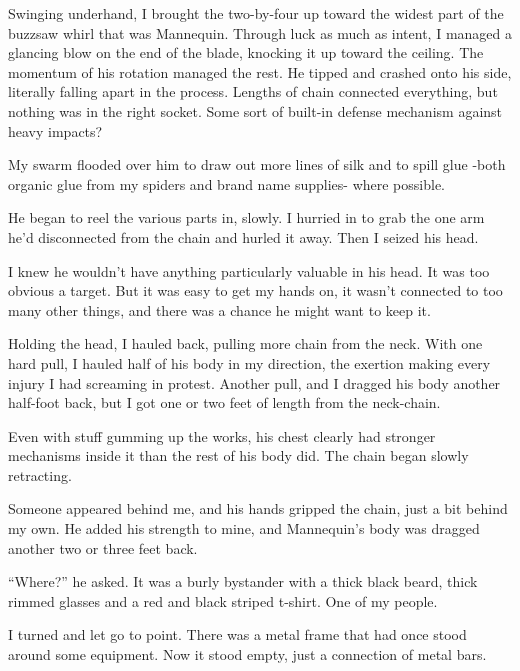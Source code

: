 Swinging underhand, I brought the two-by-four up toward the widest part of the buzzsaw whirl that was Mannequin.  Through luck as much as intent, I managed a glancing blow on the end of the blade, knocking it up toward the ceiling.  The momentum of his rotation managed the rest.  He tipped and crashed onto his side, literally falling apart in the process.  Lengths of chain connected everything, but nothing was in the right socket.  Some sort of built-in defense mechanism against heavy impacts?



My swarm flooded over him to draw out more lines of silk and to spill glue -both organic glue from my spiders and brand name supplies- where possible.



He began to reel the various parts in, slowly.  I hurried in to grab the one arm he'd disconnected from the chain and hurled it away.  Then I seized his head.



I knew he wouldn't have anything particularly valuable in his head.  It was too obvious a target.  But it was easy to get my hands on, it wasn't connected to too many other things, and there was a chance he might want to keep it.



Holding the head, I hauled back, pulling more chain from the neck.  With one hard pull, I hauled half of his body in my direction, the exertion making every injury I had screaming in protest.  Another pull, and I dragged his body another half-foot back, but I got one or two feet of length from the neck-chain.



Even with stuff gumming up the works, his chest clearly had stronger mechanisms inside it than the rest of his body did.  The chain began slowly retracting.



Someone appeared behind me, and his hands gripped the chain, just a bit behind my own.  He added his strength to mine, and Mannequin's body was dragged another two or three feet back.



``Where?'' he asked.  It was a burly bystander with a thick black beard, thick rimmed glasses and a red and black striped t-shirt.  One of my people.



I turned and let go to point.  There was a metal frame that had once stood around some equipment.  Now it stood empty, just a connection of metal bars.



